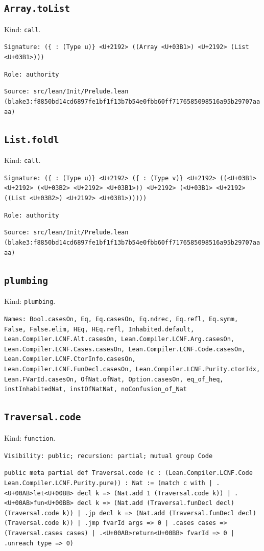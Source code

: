 \documentclass[11pt]{article}
\begin{document}
\subsection*{\texttt{Array.toList}}
\noindent Kind: \texttt{call}.\par
\noindent \texttt{Signature: (\{<U+03B1> : (Type u)\} <U+2192> ((Array <U+03B1>) <U+2192> (List <U+03B1>)))}\par
\noindent \texttt{Role: authority}\par
\noindent \texttt{Source: src/lean/Init/Prelude.lean (blake3:f8850bd14cd6897fe1bf1f13b7b54e0fbb60ff7176585098516a95b29707aaaa)}\par
\subsection*{\texttt{List.foldl}}
\noindent Kind: \texttt{call}.\par
\noindent \texttt{Signature: (\{<U+03B1> : (Type u)\} <U+2192> (\{<U+03B2> : (Type v)\} <U+2192> ((<U+03B1> <U+2192> (<U+03B2> <U+2192> <U+03B1>)) <U+2192> (<U+03B1> <U+2192> ((List <U+03B2>) <U+2192> <U+03B1>)))))}\par
\noindent \texttt{Role: authority}\par
\noindent \texttt{Source: src/lean/Init/Prelude.lean (blake3:f8850bd14cd6897fe1bf1f13b7b54e0fbb60ff7176585098516a95b29707aaaa)}\par
\subsection*{\texttt{plumbing}}
\noindent Kind: \texttt{plumbing}.\par
\noindent \texttt{Names: Bool.casesOn, Eq, Eq.casesOn, Eq.ndrec, Eq.refl, Eq.symm, False, False.elim, HEq, HEq.refl, Inhabited.default, Lean.Compiler.LCNF.Alt.casesOn, Lean.Compiler.LCNF.Arg.casesOn, Lean.Compiler.LCNF.Cases.casesOn, Lean.Compiler.LCNF.Code.casesOn, Lean.Compiler.LCNF.CtorInfo.casesOn, Lean.Compiler.LCNF.FunDecl.casesOn, Lean.Compiler.LCNF.Purity.ctorIdx, Lean.FVarId.casesOn, OfNat.ofNat, Option.casesOn, eq\_of\_heq, instInhabitedNat, instOfNatNat, noConfusion\_of\_Nat}\par
\subsection*{\texttt{Traversal.code}}
\noindent Kind: \texttt{function}.\par
\noindent \texttt{Visibility: public; recursion: partial; mutual group Code}\par
\noindent \texttt{public meta partial def Traversal.code (c : (Lean.Compiler.LCNF.Code Lean.Compiler.LCNF.Purity.pure)) : Nat :=   (match c with | .<U+00AB>let<U+00BB> decl k => (Nat.add 1 (Traversal.code k)) | .<U+00AB>fun<U+00BB> decl k => (Nat.add (Traversal.funDecl decl) (Traversal.code k)) | .jp decl k => (Nat.add (Traversal.funDecl decl) (Traversal.code k)) | .jmp fvarId args => 0 | .cases cases => (Traversal.cases cases) | .<U+00AB>return<U+00BB> fvarId => 0 | .unreach type => 0)}\par
\end{document}
